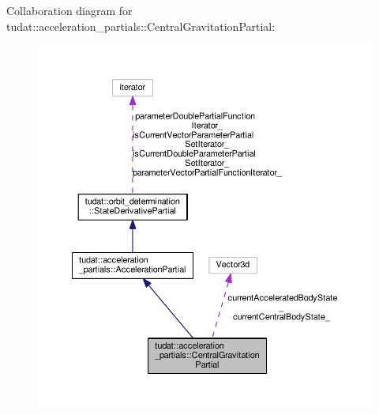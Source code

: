 Collaboration diagram for tudat\+:\+:acceleration\+\_\+partials\+:\+:Central\+Gravitation\+Partial\+:
\nopagebreak
\begin{figure}[H]
\begin{center}
\leavevmode
\includegraphics[width=350pt]{classtudat_1_1acceleration__partials_1_1CentralGravitationPartial__coll__graph}
\end{center}
\end{figure}
